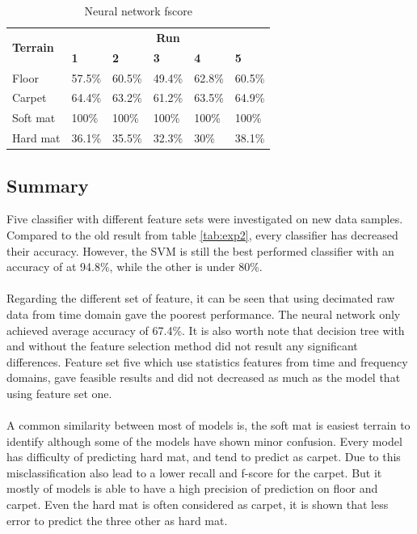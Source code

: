 \documentclass[USenglish]{ifimaster}  %
\begin{document}
	\begin{table}[h]
		\centering
		\begin{tabular}{@{}llllll@{}}
			\toprule
			\multirow{2}{*}{\textbf{Terrain}} & \multicolumn{5}{c}{\textbf{Run}} \\ \cmidrule(l){2-6} 
			& \multicolumn{1}{l|}{\textbf{1}} & \multicolumn{1}{l|}{\textbf{2}} & \multicolumn{1}{l|}{\textbf{3}} & \multicolumn{1}{l|}{\textbf{4}} & \textbf{5} \\ \midrule
			\multicolumn{1}{l|}{Floor} & \multicolumn{1}{l|}{57.5\%} & \multicolumn{1}{l|}{60.5\%} & \multicolumn{1}{l|}{49.4\%} & \multicolumn{1}{l|}{62.8\%} & 60.5\% \\ \midrule
			\multicolumn{1}{l|}{Carpet} & \multicolumn{1}{l|}{64.4\%} & \multicolumn{1}{l|}{63.2\%} & \multicolumn{1}{l|}{61.2\%} & \multicolumn{1}{l|}{63.5\%} & 64.9\% \\ \midrule
			\multicolumn{1}{l|}{Soft mat} & \multicolumn{1}{l|}{100\%} & \multicolumn{1}{l|}{100\%} & \multicolumn{1}{l|}{100\%} & \multicolumn{1}{l|}{100\%} & 100\% \\ \midrule
			\multicolumn{1}{l|}{Hard mat} & \multicolumn{1}{l|}{36.1\%} & \multicolumn{1}{l|}{35.5\%} & \multicolumn{1}{l|}{32.3\%} & \multicolumn{1}{l|}{30\%} & 38.1\% \\ \bottomrule
		\end{tabular}
		\caption{Neural network fscore}
		\label{nnfscore}
	\end{table}
	\FloatBarrier
	\newpage

\newpage
\subsection{Summary}
Five classifier with different feature sets were investigated on new data samples. Compared to the old result from table \ref{tab:exp2}, every classifier has decreased their accuracy. However, the SVM is still the best performed classifier with an accuracy of at 94.8\%, while the other is under 80\%. 
\\
\\
Regarding the different set of feature, it can be seen that using decimated raw data from time domain gave the poorest performance. The neural network only achieved average accuracy of 67.4\%. It is also worth note that decision tree with and without the feature selection method did not result any significant differences. Feature set five which use statistics features from time and frequency domains, gave feasible results and did not decreased as much as the model that using feature set one.
\\
\\
A common similarity between most of models is, the soft mat is easiest terrain to identify although some of the models have shown minor confusion. Every model has difficulty of predicting hard mat, and tend to predict as carpet. Due to this misclassification also lead to a lower recall and f-score for the carpet. But it mostly of models is able to have a high precision of prediction on floor and carpet. Even the hard mat is often considered as carpet, it is shown that less error to predict the three other as hard mat.
\end{document}

